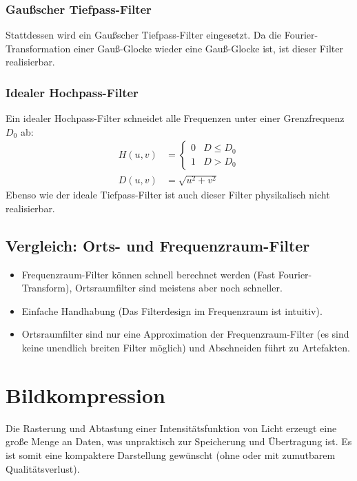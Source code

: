 			\subsubsection{Gaußscher Tiefpass-Filter}
				Stattdessen wird ein Gaußscher Tiefpass-Filter eingesetzt. Da die Fourier-Transformation einer Gauß-Glocke wieder eine Gauß-Glocke ist, ist dieser Filter realisierbar.

			\subsubsection{Idealer Hochpass-Filter}
				Ein idealer Hochpass-Filter schneidet alle Frequenzen unter einer Grenzfrequenz \( D_0 \) ab:
				\begin{align*}
					H(u, v) & =
					\begin{cases}
						0 & D \leq D_0 \\
						1 & D > D_0
					\end{cases}               \\
					D(u, v) & = \sqrt{u^2 + v^2}
				\end{align*}
				Ebenso wie der ideale Tiefpass-Filter ist auch dieser Filter physikalisch nicht realisierbar.

		\subsection{Vergleich: Orts- und Frequenzraum-Filter}
			\begin{itemize}
				\item Frequenzraum-Filter können schnell berechnet werden (Fast Fourier-Transform), Ortsraumfilter sind meistens aber noch schneller.
				\item Einfache Handhabung (Das Filterdesign im Frequenzraum ist intuitiv).
				\item Ortsraumfilter sind nur eine Approximation der Frequenzraum-Filter (es sind keine unendlich breiten Filter möglich) und Abschneiden führt zu Artefakten.
			\end{itemize}

	\section{Bildkompression}
		Die Rasterung und Abtastung einer Intensitätsfunktion von Licht erzeugt eine große Menge an Daten, was unpraktisch zur Speicherung und Übertragung ist. Es ist somit eine kompaktere Darstellung gewünscht (ohne oder mit zumutbarem Qualitätsverlust).

